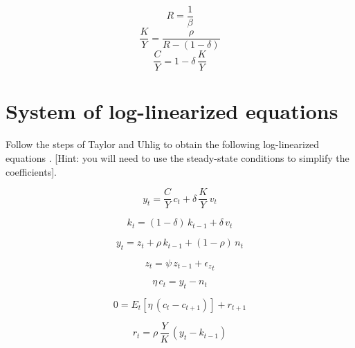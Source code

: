 \begin{dmath*}
R = \frac{1}{{{\beta}}}
\end{dmath*}
\begin{dmath*}
\frac{K}{Y} = \frac{{{\rho}}}{{R}-\left(1-{{\delta}}\right)}
\end{dmath*}
\begin{dmath*}
\frac{C}{Y} = 1-{{\delta}}\, \frac{K}{Y}
\end{dmath*}


\section{System of log-linearized equations}
Follow the steps of Taylor and Uhlig to obtain the following log-linearized equations . [Hint: you will need to use the steady-state conditions to simplify the coefficients].

\begin{dmath}
{{y}_{t}}=\frac{C}{Y}\, {{c}_{t}}+{{\delta}}\, \frac{K}{Y}\, {{v}_{t}}
\end{dmath}

\begin{dmath}
{{k}_{t}}=\left(1-{{\delta}}\right)\, {{k}_{t-1}}+{{\delta}}\, {{v}_{t}}
\end{dmath}

\begin{dmath}
{{y}_{t}}={{z}_{t}}+{{\rho}}\, {{k}_{t-1}} + {(1-\rho)}\,{{n}_{t}}
\end{dmath}


\begin{dmath}
{{z}_{t}}={{\psi}}\, {{z}_{t-1}}+{{\epsilon_z}_{t}}
\end{dmath}

\begin{dmath}
{{\eta}}\, {{c}_{t}} = {{y}_{t}} - {{n}_{t}}
\end{dmath}


\begin{dmath}
0 = E_t[{{\eta}}\,({{c}_{t}} - {{c}_{t+1}})] + {{r}_{t+1}}
\end{dmath}

\begin{dmath}
{{r}_{t}}={{\rho}}\, \frac{Y}{{K}}\, \left({{y}_{t}}-{{k}_{t-1}}\right)
\end{dmath}



